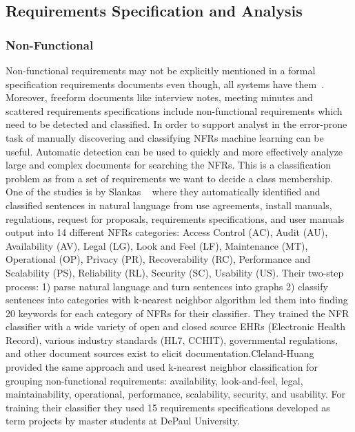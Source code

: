 \subsection{Requirements Specification and Analysis}

\subsubsection{Non-Functional}

Non-functional requirements may not be explicitly mentioned in a formal
specification requirements documents even though, all systems have
them~\cite{Slankas:2013}. Moreover, freeform documents like interview notes,
meeting minutes and scattered requirements specifications include non-functional
requirements which need to be detected and classified. In order to support
analyst in the error-prone task of manually discovering and classifying NFRs
machine learning can be useful. Automatic detection can be used to quickly and
more effectively analyze large and complex documents for searching the
NFRs\cite{Cleland-Huang2007}. This is a classification problem as from a set of
requirements we want to decide a class membership. \\

One of the studies is by Slankas \etal~\cite{Slankas:2013} where they
automatically identified and classified sentences in natural language from use
agreements, install manuals, regulations, request for proposals, requirements
specifications, and user manuals output into 14 different NFRs categories:
Access Control (AC), Audit (AU), Availability (AV), Legal (LG), Look and Feel
(LF), Maintenance (MT), Operational (OP), Privacy (PR), Recoverability (RC),
Performance and Scalability (PS), Reliability (RL), Security (SC), Usability
(US).
Their two-step process:
1) parse natural language and turn sentences into graphs 2) classify sentences into categories with k-nearest neighbor algorithm
led them into finding 20 keywords for each category of NFRs for their
classifier. They trained the NFR classifier with a wide variety of open and
closed source EHRs (Electronic Health Record), various industry standards (HL7,
CCHIT), governmental regulations, and other document sources exist to elicit
documentation.\newline Cleland-Huang \etal~\cite{Cleland-Huang2007} provided the
same approach and used k-nearest neighbor classification for grouping
non-functional requirements: availability, look-and-feel, legal,
maintainability, operational, performance, scalability, security, and usability.
For training their classifier they used 15 requirements specifications developed
as term projects by master students at DePaul University.

